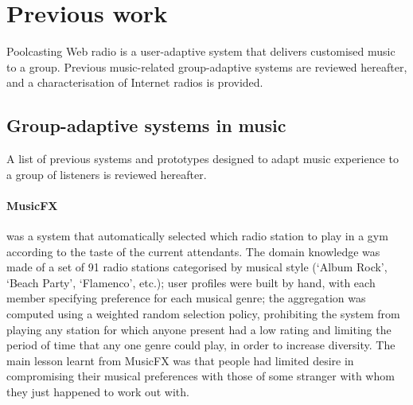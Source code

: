 % 



\section{Previous work} %
\label{sec:previous_work9}

Poolcasting Web radio is a user-adaptive system that delivers customised music to a group.
Previous music-related group-adaptive systems are reviewed hereafter, and a characterisation of Internet radios is provided.

\subsection{Group-adaptive systems in music} %
\label{sub:similar_applications}

A list of previous systems and prototypes designed to adapt music experience to a group of listeners is reviewed hereafter.

\paragraph{MusicFX} %
\label{par:musicfx_mccarthy98}
\cite{McCarthy98} was a system that automatically selected which radio station to play in a gym according to the taste of the current attendants.
The domain knowledge was made of a set of 91 radio stations categorised by musical style (`Album Rock', `Beach Party', `Flamenco', etc.); user profiles were built by hand, with each member specifying preference for each musical genre; the aggregation was computed using a weighted random selection policy, prohibiting the system from playing any station for which anyone present had a low rating and limiting the period of time that any one genre could play, in order to increase diversity. 
The main lesson learnt from MusicFX was that people had limited desire in compromising their musical preferences with those of some stranger with whom they just happened to work out with.

